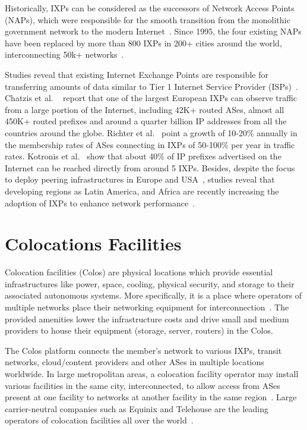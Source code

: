 	Historically, IXPs can be considered as the successors of Network Access Points (NAPs), which were responsible for the smooth transition from the monolithic government network to the modern Internet~\cite{Chatzis:2013}. Since 1995, the four existing NAPs have been replaced by more than 800 IXPs in 200+ cities around the world, interconnecting 50k+ networks~\cite{Ager:2012, Giotsas:2015:MPI:2716281.2836122}.

	Studies reveal that existing Internet Exchange Points are responsible for transferring amounts of data similar to Tier 1 Internet Service Provider (ISPs)~\cite{Ager:2012}. Chatzis et al. ~\cite{Chatzis:2013:BUL:2504730.2504746} report that one of the largest European IXPs can observe traffic from a large portion of the Internet, including 42K+ routed ASes, almost all 450K+ routed prefixes and around a quarter billion IP addresses from all the countries around the globe. Richter et al.~\cite{Richter:2014} point a growth of 10-20\% annually in the membership rates of ASes connecting in IXPs of 50-100\% per year in traffic rates. Kotronis et al.~\cite{Kotronis:2015:IPI:2745844.2745877} show that about 40\% of IP prefixes advertised on the Internet can be reached directly from around 5 IXPs. Besides, despite the focus to deploy peering infrastructures in Europe and USA~\cite{Chatzis:2013, Chatzis:2015:QVO:2717646.2717650}, studies reveal that developing regions as Latin America, and Africa are recently increasing the adoption of IXPs to enhance network performance~\cite{DissectingBrazilianIXP, Fanou:2017:ICC:3131365.3131394}.


	\section{Colocations Facilities}
	\label{subsec:colos}

	Colocation facilities (Colos) are physical locations which provide essential infrastructures like power, space, cooling, physical security, and storage to their associated autonomous systems. More specifically, it is a place where operators of multiple networks place their networking equipment for interconnection~\cite{BITAG}. The provided amenities lower the infrastructure costs and drive small and medium providers to house their equipment (storage, server, routers) in the Colos.

	The Colos platform connects the member's network to various IXPs, transit networks, cloud/content providers and other ASes in multiple locations worldwide. In large metropolitan areas, a colocation facility operator may install various facilities in the same city, interconnected, to allow access from ASes present at one facility to networks at another facility in the same region~\cite{Giotsas:2015:MPI:2716281.2836122}. Large carrier-neutral companies such as Equinix and Telehouse are the leading operators of colocation facilities all over the world~\cite{Kotronis:2017:STC:3131365.3131388}. 

	


	